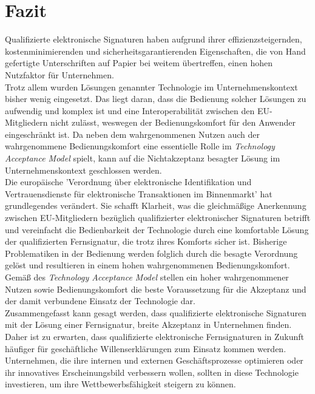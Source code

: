 \documentclass[deutsch]{lib/llncs/llncs}
\begin{document}
\section{Fazit}
Qualifizierte elektronische Signaturen haben aufgrund ihrer effizienzsteigernden, kostenminimierenden und sicherheitsgarantierenden Eigenschaften, die von Hand gefertigte Unterschriften auf Papier bei weitem übertreffen, einen hohen Nutzfaktor für Unternehmen. \\
Trotz allem wurden Lösungen genannter Technologie im Unternehmenskontext bisher wenig eingesetzt. Das liegt daran, dass die Bedienung solcher Lösungen zu aufwendig und komplex ist und eine Interoperabilität zwischen den EU-Mitgliedern nicht zulässt, weswegen der Bedienungskomfort für den Anwender eingeschränkt ist. Da neben dem wahrgenommenen Nutzen auch der wahrgenommene Bedienungskomfort eine essentielle Rolle im \textit{Technology Acceptance Model} spielt, kann auf die Nichtakzeptanz besagter Lösung im Unternehmenskontext geschlossen werden. \\
Die europäische 'Verordnung über elektronische Identifikation und Vertrauensdienste für elektronische Transaktionen im Binnenmarkt' hat grundlegendes verändert. Sie schafft Klarheit, was die gleichmäßige Anerkennung zwischen EU-Mitgliedern bezüglich qualifizierter elektronischer Signaturen betrifft und vereinfacht die Bedienbarkeit der Technologie durch eine komfortable Lösung der qualifizierten Fernsignatur, die trotz ihres Komforts sicher ist. Bisherige Problematiken in der Bedienung werden folglich durch die besagte Verordnung gelöst und resultieren in einem hohen wahrgenommenen Bedienungskomfort. \\
Gemäß des \textit{Technology Acceptance Model} stellen ein hoher wahrgenommener Nutzen sowie Bedienungskomfort die beste Voraussetzung für die Akzeptanz und der damit verbundene Einsatz der Technologie dar. \\
Zusammengefasst kann gesagt werden, dass qualifizierte elektronische Signaturen mit der Lösung einer Fernsignatur, breite Akzeptanz in Unternehmen finden. Daher ist zu erwarten, dass qualifizierte elektronische Fernsignaturen in Zukunft häufiger für geschäftliche Willenserklärungen zum Einsatz kommen werden. Unternehmen, die ihre internen und externen Geschäftsprozesse optimieren oder ihr innovatives Erscheinungsbild verbessern wollen, sollten in diese Technologie investieren, um ihre Wettbewerbsfähigkeit steigern zu können.




\end{document}
